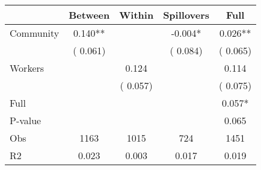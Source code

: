 
\begin{tabular}{l*{4}{c}}\hline&\multicolumn{1}{c}{Between}&\multicolumn{1}{c}{Within}&\multicolumn{1}{c}{Spillovers}&\multicolumn{1}{c}{Full}\\ \hline
 Community             &              0.140**      &                                               &       -0.004* &         0.026**                            \\ 
                               &        (       0.061)           &                                       &       (       0.084)     &      (       0.065)                                           \\ 
 Workers       &                                               &        0.124    &                                &             0.114                            \\ 
                               &                                               & (       0.057)                  &                                        &      (       0.075)                                           \\ 
\hline                                                                                                                                                                                                                                            
 Full                  &                                               &                                               &                                        &             0.057*                                     \\ 
 P-value               &                                               &                                               &                                        &             0.065                                           \\ 
 Obs                   &               1163               &       1015                       &       724                &              1451                                               \\ 
 R2                    &                      0.023              &              0.003                      &              0.017               &                     0.019                                              \\ 
\hline \end{tabular}                                                                                                                                                                                                              